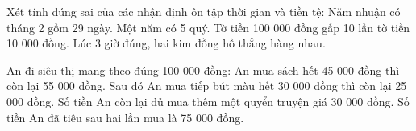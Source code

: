 \begin{ex} %
Xét tính đúng sai của các nhận định ôn tập thời gian và tiền tệ:
\choiceTF
{\True Năm nhuận có tháng 2 gồm 29 ngày.}
{Một năm có 5 quý.}
{\True Tờ tiền 100 000 đồng gấp 10 lần tờ tiền 10 000 đồng.}
{Lúc 3 giờ đúng, hai kim đồng hồ thẳng hàng nhau.}
\end{ex}

\begin{ex} %
An đi siêu thị mang theo đúng 100 000 đồng:
\choiceTF
{\True An mua sách hết 45 000 đồng thì còn lại 55 000 đồng.}
{\True Sau đó An mua tiếp bút màu hết 30 000 đồng thì còn lại 25 000 đồng.}
{Số tiền An còn lại đủ mua thêm một quyển truyện giá 30 000 đồng.}
{\True Số tiền An đã tiêu sau hai lần mua là 75 000 đồng.}
\end{ex}

